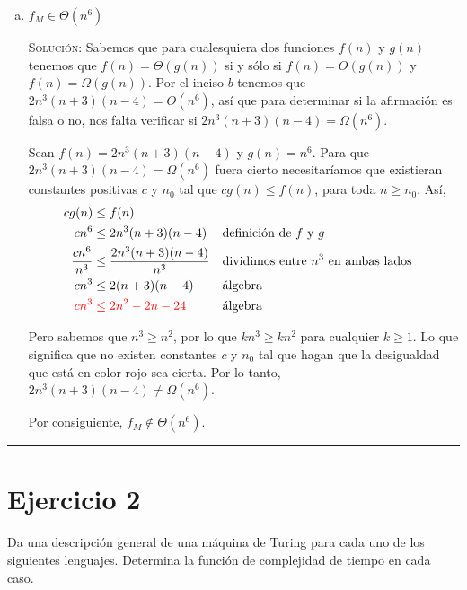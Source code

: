 \documentclass[12pt,letterpaper]{article}
\newcommand{\lineaxd}{{\color{brown}\rule{\linewidth}{0.5mm}}}
\begin{document}
\begin{enumerate}[a.]
    \item $f_M \in \Theta(n^6)$ 

    \textsc{Solución:} Sabemos que para cualesquiera dos funciones $f(n)$ y 
    $g(n)$ tenemos que $f(n) = \Theta(g(n))$ si y sólo si $f(n) = O(g(n))$ y 
    $f(n) = \Omega(g(n))$. Por el inciso $b$ tenemos que $2n^3(n+3)(n-4) = 
    O(n^6)$, así que para determinar si la afirmación es falsa o no, nos falta
    verificar si $2n^3(n+3)(n-4) = \Omega(n^6)$. 

    Sean $f(n) = 2n^3(n+3)(n-4)$ y $g(n) = n^6$. Para que $2n^3(n+3)(n-4) = 
    \Omega(n^6)$ fuera cierto necesitaríamos que existieran constantes positivas 
    $c$ y $n_0$ tal que $cg(n) \leq f(n)$, para toda $n \geq n_0$. Así, 
    \begin{align*}
        cg(n) &\leq f(n) \\ 
        cn^6 &\leq 2n^3(n+3)(n-4) 
        && \text{definición de $f$ y $g$} \\
        \frac{cn^6}{n^3} &\leq \frac{2n^3(n+3)(n-4)}{n^3} 
        && \text{dividimos entre $n^3$ en ambas lados} \\ 
        cn^3 &\leq 2(n+3)(n-4)
        && \text{álgebra} \\ 
        \color{red}cn^3 &\color{red}\leq \color{red}2n^2 - 2n -24
        && \text{álgebra}
    \end{align*}

    Pero sabemos que $n^3 \geq n^2$, por lo que $kn^3 \geq kn^2$ para 
    cualquier $k \geq 1$. Lo que significa que no existen constantes $c$ y 
    $n_0$ tal que hagan que la desigualdad que está en color rojo sea cierta. 
    Por lo tanto, $2n^3(n+3)(n-4) \not = \Omega(n^6)$.

    Por consiguiente, $f_M \not \in \Theta(n^6)$. 
\end{enumerate}
    
\lineaxd

\section*{Ejercicio 2}

Da una descripción general de una máquina de Turing para cada uno de los siguientes lenguajes. Determina la función de complejidad de tiempo en cada caso.
\end{document}
